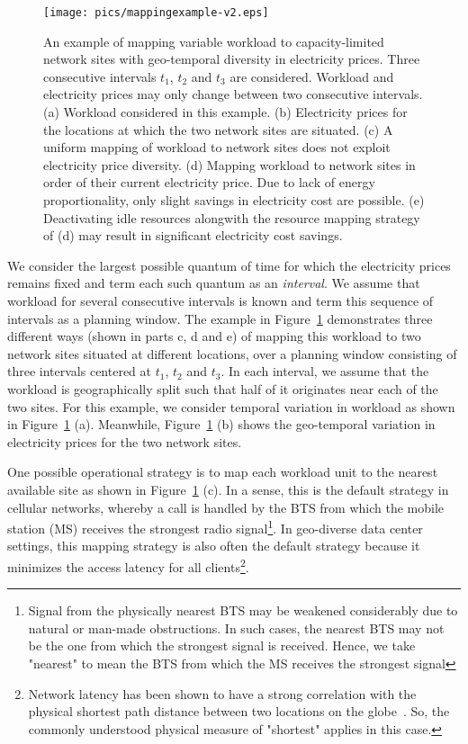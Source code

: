 \begin{figure}
\centering
\texttt{[image: pics/mappingexample-v2.eps]}
\caption{An example of mapping variable workload to capacity-limited network sites with geo-temporal diversity in electricity prices. Three consecutive intervals $t_1$, $t_2$ and $t_3$ are considered. Workload and electricity prices may only change between two consecutive intervals. (a) Workload considered in this example. (b) Electricity prices for the locations at which the two network sites are situated. (c) A uniform mapping of workload to network sites does not exploit electricity price diversity. (d) Mapping workload to network sites in order of their current electricity price. Due to lack of energy proportionality, only slight savings in electricity cost are possible. (e) Deactivating idle resources alongwith the resource mapping strategy of (d) may result in significant electricity cost savings.}
\label{fig:mappingexample}
\end{figure}

We consider the largest possible quantum of time for which the electricity prices remains fixed and term each such quantum as an \textit{interval}. We assume that workload for several consecutive intervals is known and term this sequence of intervals as a planning window. The example in Figure~\ref{fig:mappingexample} demonstrates three different ways (shown in parts c, d and e) of mapping this workload to two network sites situated at different locations, over a planning window consisting of three intervals centered at $t_1$, $t_2$ and $t_3$. In each interval, we assume that the workload is geographically split such that half of it originates near each of the two sites. For this example, we consider temporal variation in workload as shown in Figure~\ref{fig:mappingexample} (a). Meanwhile, Figure~\ref{fig:mappingexample} (b) shows the geo-temporal variation in electricity prices for the two network sites.

One possible operational strategy is to map each workload unit to the nearest available site as shown in Figure~\ref{fig:mappingexample} (c). In a sense, this is the default strategy in cellular networks, whereby a call is handled by the BTS from which the mobile station (MS) receives the strongest radio signal\footnote{Signal from the physically nearest BTS may be weakened considerably due to natural or man-made obstructions. In such cases, the nearest BTS may not be the one from which the strongest signal is received. Hence, we take "nearest" to mean the BTS from which the MS receives the strongest signal}. In geo-diverse data center settings, this mapping strategy is also often the default strategy because it minimizes the access latency for all clients\footnote{Network latency has been shown to have a strong correlation with the physical shortest path distance between two locations on the globe~\cite{dina:p2pdelay:infocom:2004}. So, the commonly understood physical measure of "shortest" applies in this case.}. 

